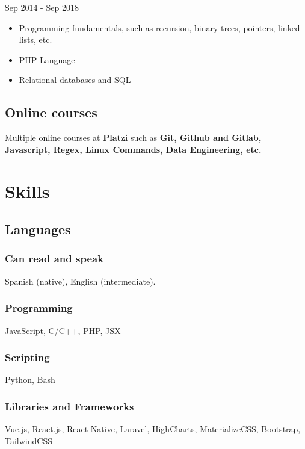 \documentclass{article}
\begin{document}
Sep 2014 - Sep 2018

\begin{itemize}
    \item Programming fundamentals, such as recursion, binary trees, pointers, linked lists, etc.
    \item PHP Language
    \item Relational databases and SQL
\end{itemize}

\subsection{Online courses}

Multiple online courses at \textbf{Platzi} such as \textbf{Git, Github and Gitlab, Javascript, Regex, Linux Commands, Data Engineering, etc.}

\section{Skills}

\subsection{Languages}

\subsubsection{Can read and speak}

Spanish (native), English (intermediate).

\subsubsection{Programming}

JavaScript, C/C++, PHP, JSX

\subsubsection{Scripting}

Python, Bash

\subsubsection{Libraries and Frameworks}

Vue.js, React.js, React Native, Laravel, HighCharts, MaterializeCSS, Bootstrap, TailwindCSS
\end{document}
